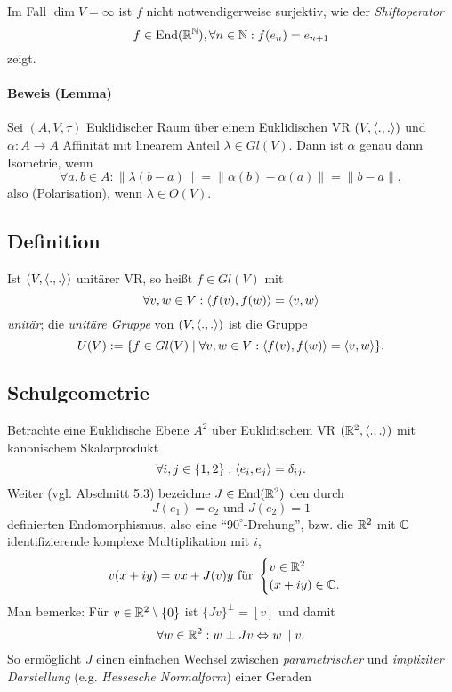 	Im Fall $ \dim V = \infty $ ist $ f $ nicht notwendigerweise surjektiv, wie der \emph{Shiftoperator}
		\[ f\in \operatorname{End}(\mathbb{R}^{\mathbb{N}}), \forall n\in \mathbb{N}: f(e_n) = e_{n+1} \]
	zeigt.
\paragraph{Beweis (Lemma)}
	Sei $ (A,V,\tau) $ Euklidischer Raum über einem Euklidischen VR $ (V,\langle .,. \rangle) $ und $\alpha:A\to A $ Affinität mit linearem Anteil $ \lambda\in Gl(V) $. Dann ist $ \alpha $ genau dann Isometrie, wenn
		\[ \forall a,b\in A: \|\lambda(b-a)\| = \|\alpha(b)-\alpha(a)\| = \|b-a\|,  \]
	also (Polarisation), wenn $ \lambda\in O(V) $.
\subsection{Definition}
\begin{Definition}
	Ist $ (V,\langle .,. \rangle) $ unitärer VR, so heißt $ f\in Gl(V) $ mit
		\[ \forall v,w\in V: \langle f(v),f(w) \rangle = \langle v,w \rangle \]
	\emph{unitär}; die \emph{unitäre Gruppe} von $ (V,\langle .,. \rangle) $ ist die Gruppe
		\[ U(V) := \{f\in Gl(V)\mid \forall v,w\in V: \langle f(v),f(w) \rangle = \langle v,w \rangle \}. \]
\end{Definition}


\subsection{Schulgeometrie}
	Betrachte eine Euklidische Ebene $ A^2 $ über Euklidischem VR $ (\mathbb{R}^2,\langle .,. \rangle) $ mit kanonischem Skalarprodukt
		\[ \forall i,j\in \{1,2\}:\langle e_i,e_j \rangle = \delta_{ij}. \]
	Weiter (vgl. Abschnitt 5.3) bezeichne $ J\in \operatorname{End}(\mathbb{R}^2) $ den durch
		\[ J(e_1) = e_2 \text{ und } J(e_2) = 1 \]
	definierten Endomorphismus, also eine "`$ 90^{\circ}$-Drehung"',
	bzw. die $ \mathbb{R}^2 $ mit $ \mathbb{C} $ identifizierende komplexe Multiplikation mit $ i $,
		\[ v(x+iy) = vx+J(v)y \text{ für }\begin{cases}
		v\in \mathbb{R}^2\\ (x+iy)\in \mathbb{C}.
		\end{cases} \]
	Man bemerke: Für $ v\in \mathbb{R}^2\setminus \{0\} $ ist $ \{Jv\}^\perp = [v] $ und damit
		\[ \forall w\in \mathbb{R}^2: w\perp Jv \Leftrightarrow w\parallel v. \]
     So ermöglicht $ J $ einen einfachen Wechsel zwischen \emph{parametrischer} und \emph{impliziter Darstellung} (e.g. \emph{Hessesche Normalform}) einer Geraden
     
